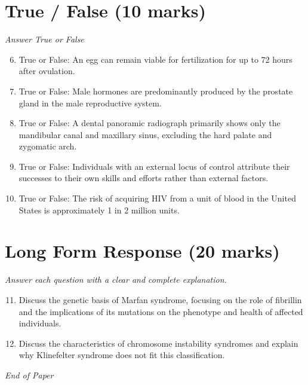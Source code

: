 \documentclass[12pt]{article}
\begin{document}
\section*{True / False (10 marks)}
\textit{Answer True or False}
\begin{enumerate}[label=\arabic*.]
\setcounter{enumi}{5}
\item True or False: An egg can remain viable for fertilization for up to 72 hours after ovulation.
\item True or False: Male hormones are predominantly produced by the prostate gland in the male reproductive system.
\item True or False: A dental panoramic radiograph primarily shows only the mandibular canal and maxillary sinus, excluding the hard palate and zygomatic arch.
\item True or False: Individuals with an external locus of control attribute their successes to their own skills and efforts rather than external factors.
\item True or False: The risk of acquiring HIV from a unit of blood in the United States is approximately 1 in 2 million units.
\end{enumerate}

\section*{Long Form Response (20 marks)}
\textit{Answer each question with a clear and complete explanation.}
\begin{enumerate}[label=\arabic*.]
\setcounter{enumi}{10}
\item Discuss the genetic basis of Marfan syndrome, focusing on the role of fibrillin and the implications of its mutations on the phenotype and health of affected individuals.
\item Discuss the characteristics of chromosome instability syndromes and explain why Klinefelter syndrome does not fit this classification.
\end{enumerate}

\vfill
\noindent\textit{End of Paper}
\end{document}
